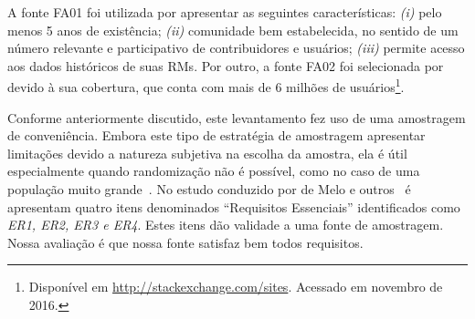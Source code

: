 \begin{table}[htpb]
\centering
{}
\caption{Fontes de Amostragem utilizadas no levantamento com questionário.}
\label{tab:fonte-amostragens}
\end{table}

A fonte FA01 foi utilizada por apresentar as seguintes características:
\textit{(i)} pelo menos 5 anos de existência; \textit{(ii)} comunidade bem
estabelecida, no sentido de um número relevante e participativo de
contribuidores e usuários; \textit{(iii)} permite acesso aos dados históricos de
suas RMs. Por outro, a fonte FA02 foi selecionada por devido à sua cobertura,
que conta com mais de 6 milhões de usuários\footnote{Disponível em
	\url{http://stackexchange.com/sites}. Acessado em novembro de 2016.}.

Conforme anteriormente discutido, este levantamento fez uso de uma amostragem de
conveniência. Embora este tipo de estratégia de amostragem apresentar limitações
devido a natureza subjetiva na escolha da amostra, ela é útil especialmente
quando randomização não é possível, como no caso de uma população muito
grande~\cite{etikan2016comparison}. No estudo conduzido por de Melo e
outros~\cite{de2014towards} é apresentam quatro itens denominados ``Requisitos
Essenciais'' identificados como \textit{ER1, ER2, ER3 e ER4}. Estes itens dão
validade a uma fonte de amostragem. Nossa avaliação é que nossa fonte satisfaz
bem todos requisitos.



